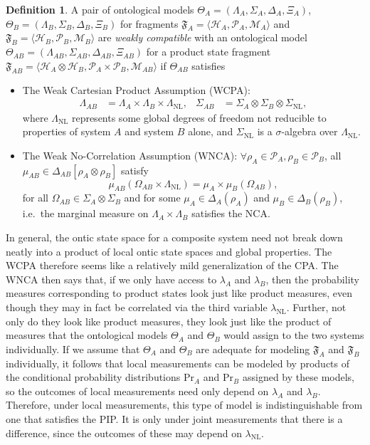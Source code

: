 \documentclass[DIV=calc,paper=a4,fontsize=11pt,twocolumn]{scrartcl} %
\theoremstyle{definition}
\newtheorem{definition}{Definition}[section]
\theoremstyle{plain}
\newcommand{\Hilb}[1][]{\ensuremath{\mathcal{H}_{#1}}}
\begin{document}
\begin{definition}
A pair of ontological models $\Theta_A = (\Lambda_A, \Sigma_A,
\Delta_A, \Xi_A)$, $\Theta_B = (\Lambda_B, \Sigma_B, \Delta_B, \Xi_B)$
for fragments $\mathfrak{F}_A = \langle \Hilb[A], \mathcal{P}_A,
\mathcal{M}_A \rangle$ and $\mathfrak{F}_B = \langle \Hilb[B],
\mathcal{P}_B, \mathcal{M}_B \rangle$ are \emph{weakly compatible}
with an ontological model $\Theta_{AB} = (\Lambda_{AB}, \Sigma_{AB},
\Delta_{AB}, \Xi_{AB})$ for a product state fragment
$\mathfrak{F}_{AB} = \langle \Hilb[A] \otimes \Hilb[B],
\mathcal{P}_A \times \mathcal{P}_B, \mathcal{M}_{AB} \rangle$ if
$\Theta_{AB}$ satisfies
\begin{itemize}
\item The Weak Cartesian Product Assumption (WCPA):
\begin{align}
\Lambda_{AB} & = \Lambda_A \times \Lambda_B \times
\Lambda_{\text{NL}}, & \Sigma_{AB} & = \Sigma_A \otimes \Sigma_B \otimes
\Sigma_{\text{NL}},
\end{align}
where $\Lambda_{\text{NL}}$ represents some global degrees of
freedom not reducible to properties of system $A$ and system $B$
alone, and $\Sigma_{\text{NL}}$ is a $\sigma$-algebra over
$\Lambda_{\text{NL}}$.
\item The Weak No-Correlation Assumption (WNCA): $\forall \rho_A \in
\mathcal{P}_A, \rho_B \in \mathcal{P}_B$, all $\mu_{AB} \in
\Delta_{AB}[\rho_A \otimes \rho_B]$ satisfy
\begin{equation}
\mu_{AB}(\Omega_{AB} \times \Lambda_{\text{NL}}) = \mu_A
\times \mu_B(\Omega_{AB}),
\end{equation}
for all $\Omega_{AB} \in \Sigma_A \otimes \Sigma_B$ and for some
$\mu_A \in \Delta_A(\rho_A)$ and $\mu_B \in \Delta_B(\rho_B)$,
i.e.\ the marginal measure on $\Lambda_A \times \Lambda_B$
satisfies the NCA.
\end{itemize}
\end{definition}

In general, the ontic state space for a composite system need not
break down neatly into a product of local ontic state spaces and
global properties.  The WCPA therefore seems like a relatively mild
generalization of the CPA\@.  The WNCA then says that, if we only have
access to $\lambda_A$ and $\lambda_B$, then the probability measures
corresponding to product states look just like product measures, even
though they may in fact be correlated via the third variable
$\lambda_{\text{NL}}$.  Further, not only do they look like product
measures, they look just like the product of measures that the
ontological models $\Theta_A$ and $\Theta_B$ would assign to the two
systems individually.  If we assume that $\Theta_A$ and $\Theta_B$ are
adequate for modeling $\mathfrak{F}_A$ and $\mathfrak{F}_B$
individually, it follows that local measurements can be modeled by
products of the conditional probability distributions $\text{Pr}_A$
and $\text{Pr}_B$ assigned by these models, so the outcomes of local
measurements need only depend on $\lambda_A$ and $\lambda_B$.
Therefore, under local measurements, this type of model is
indistinguishable from one that satisfies the PIP\@.  It is only under
joint measurements that there is a difference, since the outcomes of
these may depend on $\lambda_{\text{NL}}$.
\end{document}
